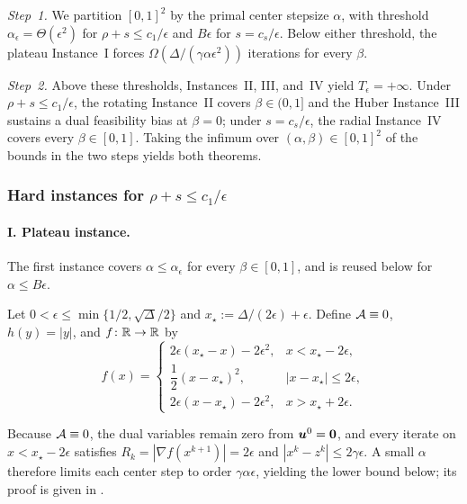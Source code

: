 \textit{Step~1.} We partition \([0,1]^2\) by the primal center stepsize
\(\alpha\), with threshold \(\alpha_\epsilon=\Theta(\epsilon^2)\) for
\(\rho+s\le c_1/\epsilon\) and \(B\epsilon\) for \(s=c_s/\epsilon\). Below
either threshold, the plateau Instance~I forces
\(\Omega(\Delta/(\gamma\alpha\epsilon^2))\) iterations for every \(\beta\).

\textit{Step~2.} Above these thresholds, Instances~II, III, and~IV yield
\(T_\epsilon=+\infty\). Under \(\rho+s\le c_1/\epsilon\), the rotating
Instance~II covers \(\beta\in(0,1]\) and the Huber Instance~III sustains a dual
feasibility bias at \(\beta=0\); under \(s=c_s/\epsilon\), the radial
Instance~IV covers every \(\beta\in[0,1]\). Taking the infimum over
\((\alpha,\beta)\in[0,1]^2\) of the bounds in the two steps yields both
theorems.

\subsubsection{Hard instances for \texorpdfstring{\(\rho+s\le c_1/\epsilon\)}{rho+s <= c1/epsilon}}

\paragraph{I. Plateau instance.}
The first instance covers \(\alpha\le\alpha_\epsilon\) for every
\(\beta\in[0,1]\), and is reused below for \(\alpha\le B\epsilon\).

\begin{example}
\label{ex:plateau}
Let \(0<\epsilon\le\min\{1/2,\sqrt{\Delta}/2\}\) and
\(x_\star:=\Delta/(2\epsilon)+\epsilon\). Define \(\mathcal{A}\equiv0\),
\(h(y)=|y|\), and \(f\colon\mathbb{R}\to\mathbb{R}\) by
\[
f(x)=
\begin{cases}
2\epsilon(x_\star-x)-2\epsilon^2, & x<x_\star-2\epsilon,\\[4pt]
\dfrac12(x-x_\star)^2, & |x-x_\star|\le2\epsilon,\\[4pt]
2\epsilon(x-x_\star)-2\epsilon^2, & x>x_\star+2\epsilon.
\end{cases}
\]
\end{example}

Because \(\mathcal{A}\equiv0\), the dual variables remain zero from \(\bm{u}^0=\bm{0}\),
and every iterate on \(x<x_\star-2\epsilon\) satisfies
\(R_k=|\nabla f(x^{k+1})|=2\epsilon\) and \(|x^k-z^k|\le2\gamma\epsilon\). A
small \(\alpha\) therefore limits each center step to order
\(\gamma\alpha\epsilon\), yielding the lower bound below; its proof is given in
.

